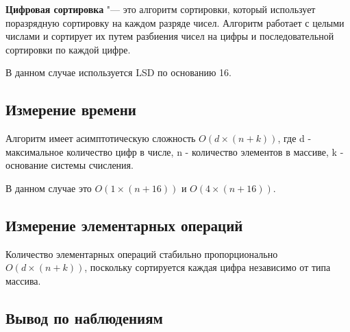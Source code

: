 \documentclass[11pt]{article}
\begin{document}
\textbf{Цифровая сортировка} "--- это алгоритм сортировки, который использует поразрядную сортировку на каждом разряде чисел. Алгоритм работает
с целыми числами и сортирует их путем разбиения чисел на цифры и последовательной сортировки по каждой цифре.

В данном случае используется LSD по основанию 16.

\setcounter{subsection}{0}
\subsection{Измерение времени}

\begin{center}
\end{center}
{ \hspace*{\fill} }

\begin{center}
\end{center}
{ \hspace*{\fill} }

Алгоритм имеет асимптотическую сложность $O(d \times (n + k))$, где d - максимальное количество цифр
в числе, n - количество элементов в массиве, k - основание системы счисления.

В данном случае это $O(1 \times (n + 16))$ и $O(4 \times (n + 16))$.

\subsection{Измерение элементарных операций}

\begin{center}
\end{center}
{ \hspace*{\fill} }

\begin{center}
\end{center}
{ \hspace*{\fill} }

Количество элементарных операций стабильно пропорционально $O(d \times (n + k))$,
поскольку сортируется каждая цифра независимо от типа массива.

\subsection{Вывод по наблюдениям}
\end{document}
